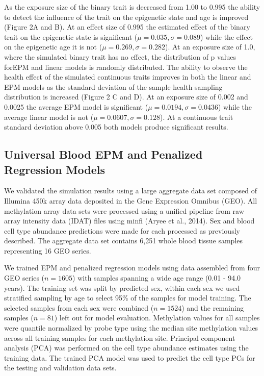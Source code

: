 \documentclass{article}
\begin{document}
{\begin{linenumbers}
As the exposure size of the binary trait is decreased from 1.00 to 0.995 the ability to detect the influence of the 
trait on the epigenetic state and age is improved (Figure 2A and B). At an effect size of 0.995 the estimated effect 
of the binary trait on the epigenetic state is significant ($\mu =0.035, \sigma=0.089$) while the effect on the 
epigenetic age it is not ($\mu=0.269, \sigma=0.282$). At an exposure size of 1.0, where the simulated binary trait 
has no effect, the distribution of p values forEPM and linear models is randomly distributed. The ability to observe 
the health effect of the simulated continuous traits improves in both the linear and EPM models as the standard 
deviation of the sample health sampling distribution is increased (Figure 2 C and D). At an exposure size of 0.002 
and 0.0025 the average EPM model is significant ($\mu=0.0194, \sigma=0.0436$) while the average linear model is not 
($\mu=0.0607, \sigma=0.128$). At a continuous trait standard deviation above 0.005 both models produce significant 
results. 

\subsection{Universal Blood EPM and Penalized Regression Models}

We validated the simulation results using a  large aggregate data set composed of Illumina 450k array 
data\cite{Marabita2018-yi,Ventham2016-qj,Tan2014-ns,Johnson2020-vb,Voisin2015-ch,Soriano-Tarraga2016-tf,
Dabin_undated-pr,Horvath2015-af,Kurushima2019-gc,Zannas2019-bc,Braun2019-gp,Demetriou2013-jx,Tserel2015-qr} 
deposited in the Gene Expression Omnibus\cite{Barrett2012-gu} (GEO). All methylation array data sets were processed 
using a unified pipeline from raw array intensity data (IDAT) files using minfi (Aryee et al., 2014). Sex and blood 
cell type abundance predictions were made for each processed as previously described\cite{Houseman2012-rr,Aryee2014-ky}. 
The aggregate data set contains 6,251 whole blood tissue samples representing 16 GEO series. 

We trained EPM and penalized regression models using data assembled from four GEO 
series\cite{Johansson2013-of,Liu2013-qo,Butcher2017-nr,Damaso2020-gd}  ($n=1605$) with samples spanning a wide age 
range (0.01 - 94.0 years). The training set was split by predicted sex, within each sex we used stratified sampling by 
age to select 95\% of the samples for model training. The selected samples from each sex were combined 
($n=1524$) and the remaining samples ($n=81$) left out for  model evaluation. Methylation values for all samples were 
quantile normalized by probe type\cite{Horvath2013-sk} using the median site methylation values across all training 
samples for each methylation site.  Principal component analysis (PCA) was performed on the cell type abundance 
estimates using the training data. The trained PCA model was used to predict the cell type PCs for the testing 
and validation data sets. 


\end{linenumbers}}
\end{document}
